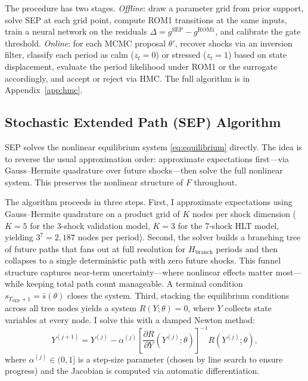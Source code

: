 \documentclass[12pt]{article}
\newcounter{algorithm}
\theoremstyle{plain}
\theoremstyle{definition}
\theoremstyle{remark}
\begin{document}
The procedure has two stages. \emph{Offline}: draw a parameter grid from prior support, solve SEP at each grid point, compute ROM1 transitions at the same inputs, train a neural network on the residuals $\Delta = g^{\text{SEP}} - g^{\text{ROM1}}$, and calibrate the gate threshold. \emph{Online}: for each MCMC proposal $\theta'$, recover shocks via an inversion filter, classify each period as calm ($z_t=0$) or stressed ($z_t=1$) based on state displacement, evaluate the period likelihood under ROM1 or the surrogate accordingly, and accept or reject via HMC. The full algorithm is in Appendix~\ref{app:hmc}.

\subsection{Stochastic Extended Path (SEP) Algorithm}
\label{subsec:sep}

SEP solves the nonlinear equilibrium system \eqref{eq:equilibrium} directly. The idea \citep{fair1983solution} is to reverse the usual approximation order: approximate expectations first---via Gauss--Hermite quadrature over future shocks---then solve the full nonlinear system. This preserves the nonlinear structure of $F$ throughout.

The algorithm proceeds in three steps. First, I approximate expectations using Gauss--Hermite quadrature on a product grid of $K$ nodes per shock dimension ($K=5$ for the 3-shock validation model, $K=3$ for the 7-shock HLT model, yielding $3^7=2{,}187$ nodes per period). Second, the solver builds a branching tree of future paths that fans out at full resolution for $H_{\text{branch}}$ periods and then collapses to a single deterministic path with zero future shocks. This funnel structure captures near-term uncertainty---where nonlinear effects matter most---while keeping total path count manageable. A terminal condition $s_{T_{\text{SEP}}+1} = \bar{s}(\theta)$ closes the system. Third, stacking the equilibrium conditions across all tree nodes yields a system $R(Y;\theta)=0$, where $Y$ collects state variables at every node. I solve this with a damped Newton method:
\begin{equation}
\label{eq:newton_iteration}
Y^{(j+1)} = Y^{(j)} - \alpha^{(j)} \left[\frac{\partial R}{\partial Y}(Y^{(j)}; \theta)\right]^{-1} R(Y^{(j)}; \theta),
\end{equation}
where $\alpha^{(j)} \in (0,1]$ is a step-size parameter (chosen by line search to ensure progress) and the Jacobian is computed via automatic differentiation.
\end{document}

